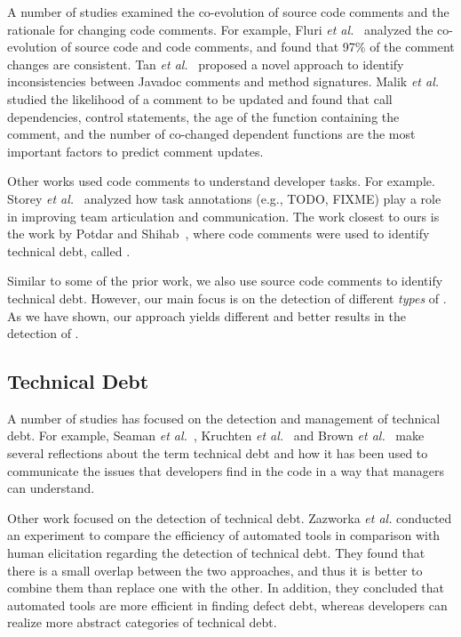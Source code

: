 A number of studies examined the co-evolution of source code comments and the rationale for changing code comments. For example, Fluri \textit{et al.}~\cite{Fluri2007WCRE} analyzed the co-evolution of source code and code comments, and found that 97\% of the comment changes are consistent. Tan \textit{et al.}~\cite{Tan2012ICST} proposed a novel approach to identify inconsistencies between Javadoc comments and method signatures. Malik \textit{et al.} \cite{Malik2008ICSM} studied the likelihood of a comment to be updated and found that call dependencies, control statements, the age of the function containing the comment, and the number of co-changed dependent functions are the most important factors to predict comment updates.

Other works used code comments to understand developer tasks. For example. Storey \textit{et al.}~\cite{Storey2008ICSE} analyzed how task annotations (e.g., TODO, FIXME) play a role in improving team articulation and communication. The work closest to ours is the work by Potdar and Shihab~\cite{Potdar2014ICSME}, where code comments were used to identify technical debt, called \SATD. 

Similar to some of the prior work, we also use source code comments to identify technical debt. However, our main focus is on the detection of different \emph{types} of \SATD. As we have shown, our approach yields different and better results in the detection of \SATD.

\subsection{Technical Debt}

A number of studies has focused on the detection and management of technical debt. For example, Seaman \textit{et al.}~\cite{Seaman2011}, Kruchten \textit{et al.}~\cite{Kruchten2013IWMTD} and Brown \textit{et al.}~\cite{Brown2010MTD} make several reflections about the term technical debt and how it has been used to communicate the issues that developers find in the code in a way that managers can understand. 

Other work focused on the detection of technical debt. Zazworka \textit{et al.} \cite{Zazworka2013CSE} conducted an experiment to compare the efficiency of automated tools in comparison with human elicitation regarding the detection of technical debt. They found that there is a small overlap between the two approaches, and thus it is better to combine them than replace one with the other. In addition, they concluded that automated tools are more efficient in finding defect debt, whereas developers can realize more abstract categories of technical debt.

